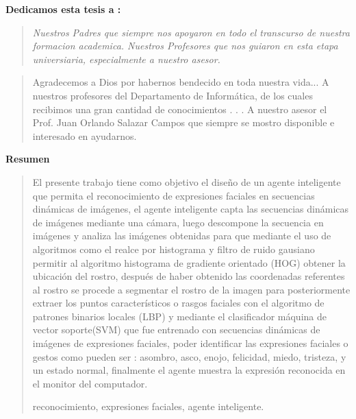  
 {\bf\Large {Dedicamos esta tesis a :}}
 \vskip 1cm
\begin{quotation}
{\it Nuestros Padres que siempre nos apoyaron en todo el transcurso de nuestra formacion academica.
\vskip 1cm
Nuestros Profesores que nos guiaron en esta etapa universiaria, especialmente a nuestro asesor.
}
\end{quotation}


\newpage

 {\bf\Large {}}
 \vskip 1.5cm
\begin{quotation}
Agradecemos a Dios por habernos bendecido en toda nuestra vida...
{\vskip 1cm}
A nuestros profesores del Departamento de Informática, de los cuales recibimos una gran cantidad de conocimientos  . . .
\vskip 1cm
A nuestro asesor el Prof. Juan Orlando Salazar Campos que siempre se mostro disponible e interesado en ayudarnos.
\vskip 1cm
 \end{quotation}


\newpage
\begin{center}
 {\bf\LARGE Resumen}
\end{center} 
\vskip 0.5cm
\begin{quotation}

El presente trabajo tiene como objetivo el diseño de un agente inteligente que permita el reconocimiento de expresiones faciales en secuencias dinámicas de imágenes, el agente inteligente capta las secuencias dinámicas de imágenes mediante una cámara, luego descompone la secuencia en imágenes y analiza las imágenes obtenidas para que mediante el uso de algoritmos como el realce por histograma y filtro de ruido gausiano permitir al algoritmo histograma de gradiente orientado (HOG) obtener la ubicación del rostro, después de haber obtenido las coordenadas referentes al rostro se procede a segmentar el rostro de la imagen para posteriormente extraer los puntos característicos o rasgos faciales con el algoritmo de patrones binarios locales (LBP) y mediante el clasificador máquina de vector soporte(SVM) que fue entrenado con secuencias dinámicas de imágenes de expresiones faciales, poder identificar las expresiones faciales o gestos como pueden ser : asombro, asco, enojo, felicidad, miedo, tristeza, y un estado normal, finalmente el agente muestra la expresión reconocida en el monitor del computador.
    

\vskip 0.3cm
\hspace*{-0.6cm}{\bf Palabras claves:} reconocimiento, expresiones faciales, agente inteligente.
\end{quotation}


